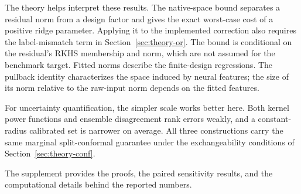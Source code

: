The theory helps interpret these results. The native-space bound separates a residual norm from a design factor and gives the exact worst-case cost of a positive ridge parameter. Applying it to the implemented correction also requires the label-mismatch term in Section~\ref{sec:theory-or}. The bound is conditional on the residual's RKHS membership and norm, which are not assumed for the benchmark target. Fitted norms describe the finite-design regressions. The pullback identity characterizes the space induced by neural features; the size of its norm relative to the raw-input norm depends on the fitted features.

For uncertainty quantification, the simpler scale works better here. Both kernel power functions and ensemble disagreement rank errors weakly, and a constant-radius calibrated set is narrower on average. All three constructions carry the same marginal split-conformal guarantee under the exchangeability conditions of Section~\ref{sec:theory-conf}.

The supplement provides the proofs, the paired sensitivity results, and the computational details behind the reported numbers.
